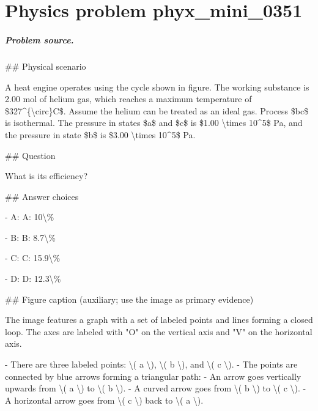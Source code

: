 
\chapter{Physics problem phyx\_mini\_0351}
\label{ch:PhyXMiniProblems_problem_phyx_mini_0351}

\paragraph{Problem source.}
\#\# Physical scenario

A heat engine operates using the cycle shown in figure. The working substance is 2.00 mol of helium gas, which reaches a maximum temperature of \$327\textasciicircum{}\{\textbackslash{}circ\}C\$. Assume the helium can be treated as an ideal gas. Process \$bc\$ is isothermal. The pressure in states \$a\$ and \$c\$ is \$1.00 \textbackslash{}times 10\textasciicircum{}5\$ Pa, and the pressure in state \$b\$ is \$3.00 \textbackslash{}times 10\textasciicircum{}5\$ Pa.

\#\# Question

What is its efficiency?

\#\# Answer choices

- A: A: 10\textbackslash{}\%

- B: B: 8.7\textbackslash{}\%

- C: C: 15.9\textbackslash{}\%

- D: D: 12.3\textbackslash{}\%

\#\# Figure caption (auxiliary; use the image as primary evidence)

The image features a graph with a set of labeled points and lines forming a closed loop. The axes are labeled with "O" on the vertical axis and "V" on the horizontal axis.

- There are three labeled points: \textbackslash{}( a \textbackslash{}), \textbackslash{}( b \textbackslash{}), and \textbackslash{}( c \textbackslash{}).
- The points are connected by blue arrows forming a triangular path:
  - An arrow goes vertically upwards from \textbackslash{}( a \textbackslash{}) to \textbackslash{}( b \textbackslash{}).
  - A curved arrow goes from \textbackslash{}( b \textbackslash{}) to \textbackslash{}( c \textbackslash{}).
  - A horizontal arrow goes from \textbackslash{}( c \textbackslash{}) back to \textbackslash{}( a \textbackslash{}).

